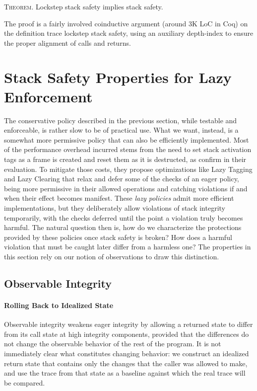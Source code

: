 \documentclass[acmsmall,review,anonymous]{acmart}\settopmatter{printfolios=true,printccs=false,printacmref=false}
\begin{document}
{\medskip
\textsc{Theorem.}
Lockstep stack safety implies stack safety.
\smallskip

The proof is a fairly involved coinductive argument
(around 3K LoC in Coq) on the definition trace lockstep stack safety,
using an auxiliary depth-index to ensure the proper alignment of
calls and returns.

\section{Stack Safety Properties for Lazy Enforcement}
\label{sec:lazy}

The conservative policy described in the previous section, while
testable and enforceable, is rather slow to be of practical use. What
we want, instead, is a somewhat more permissive policy that can also
be efficiently implemented. Most of the performance overhead incurred
stems from the need to set stack activation tags as a frame is created
and reset them as it is destructed, as
\citet{DBLP:conf/sp/RoesslerD18} confirm in their evaluation. To
mitigate those costs, they propose optimizations like Lazy Tagging and
Lazy Clearing that relax and defer some of the checks of an eager
policy, being more permissive in their allowed operations and catching
violations if and when their effect becomes manifest.
%
These \emph{lazy policies} admit more efficient implementations, but
they deliberately allow violations of stack integrity temporarily,
with the checks deferred until the point a violation truly becomes
harmful. The natural question then is, how do we characterize the
protections provided by these policies once stack safety is broken?
How does a harmful violation that must be caught later differ from a
harmless one? The properties in this section rely on our notion of
observations to draw this distinction.

\subsection{Observable Integrity}

\paragraph{Rolling Back to Idealized State}

Observable integrity weakens eager integrity by allowing a returned
state to differ from its call state at high integrity components,
provided that the differences do not change the observable behavior of
the rest of the program. It is not immediately clear what constitutes
changing behavior: we construct an idealized return state that
contains only the changes that the caller was allowed to make, and use
the trace from that state as a baseline against which the real trace
will be compared.

}
\end{document}
